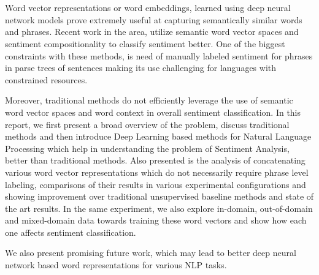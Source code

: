 \chapter{\abstractname}

	 Word vector representations or  word embeddings, learned using deep neural network models prove extremely useful at capturing semantically similar words and phrases. Recent work in the area, utilize semantic word vector spaces and sentiment compositionality to classify sentiment better. One of the biggest constraints with these methods, is need of manually labeled sentiment for phrases in parse trees of sentences making its use challenging for languages with constrained resources.
	 \newline
	 
	  Moreover, traditional methods do not efficiently leverage the use of semantic word vector spaces and word context in overall sentiment classification. In this report, we first present a broad overview of the problem, discuss traditional methods and then introduce Deep Learning based methods for Natural Language Processing which help in understanding the problem of Sentiment Analysis, better than traditional methods. Also presented is the analysis of concatenating various word vector representations which do not necessarily require phrase level labeling, comparisons of  their results in various experimental configurations and showing  improvement over traditional unsupervised baseline methods and state of the art results. In the same experiment, we also explore in-domain, out-of-domain and mixed-domain data towards training these word vectors and show how each one affects sentiment classification. 
	  \newline

	  	  We also present promising future work, which may lead to better deep neural network based word representations for various NLP tasks. 

